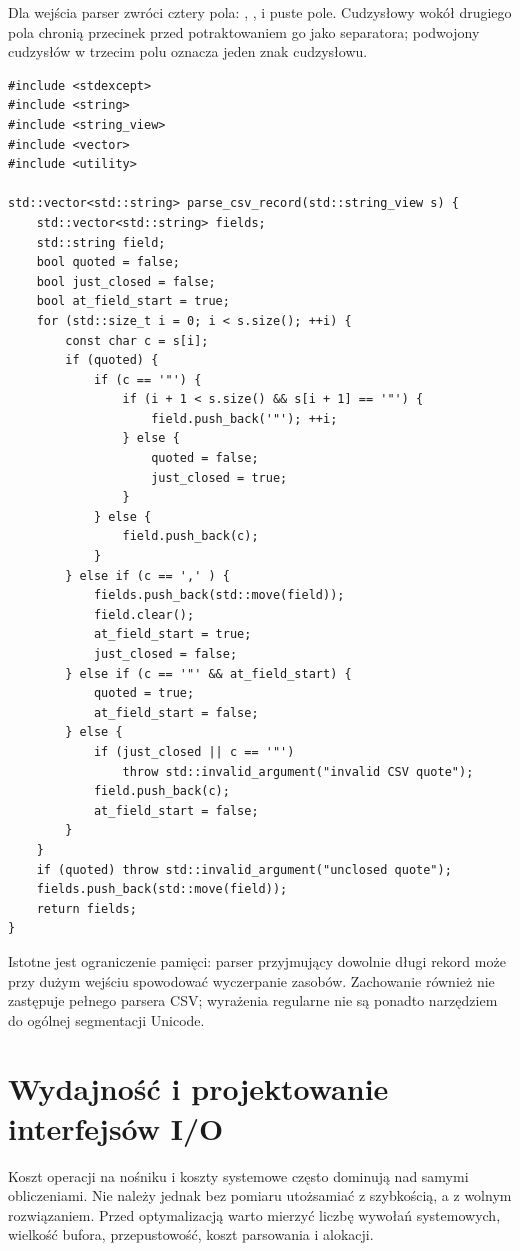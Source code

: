 Dla wejścia  parser zwróci cztery pola:
, ,  i puste pole. Cudzysłowy wokół
drugiego pola chronią przecinek przed potraktowaniem go jako separatora;
podwojony cudzysłów w trzecim polu oznacza jeden znak cudzysłowu.

\begin{lstlisting}[caption={Parser pojedynczego rekordu CSV (C++20).}]
#include <stdexcept>
#include <string>
#include <string_view>
#include <vector>
#include <utility>

std::vector<std::string> parse_csv_record(std::string_view s) {
    std::vector<std::string> fields;
    std::string field;
    bool quoted = false;
    bool just_closed = false;
    bool at_field_start = true;
    for (std::size_t i = 0; i < s.size(); ++i) {
        const char c = s[i];
        if (quoted) {
            if (c == '"') {
                if (i + 1 < s.size() && s[i + 1] == '"') {
                    field.push_back('"'); ++i;
                } else {
                    quoted = false;
                    just_closed = true;
                }
            } else {
                field.push_back(c);
            }
        } else if (c == ',' ) {
            fields.push_back(std::move(field));
            field.clear();
            at_field_start = true;
            just_closed = false;
        } else if (c == '"' && at_field_start) {
            quoted = true;
            at_field_start = false;
        } else {
            if (just_closed || c == '"')
                throw std::invalid_argument("invalid CSV quote");
            field.push_back(c);
            at_field_start = false;
        }
    }
    if (quoted) throw std::invalid_argument("unclosed quote");
    fields.push_back(std::move(field));
    return fields;
}
\end{lstlisting}

Istotne jest ograniczenie pamięci: parser przyjmujący dowolnie długi
rekord może przy dużym wejściu spowodować wyczerpanie zasobów.
Zachowanie  również nie zastępuje pełnego parsera CSV;
wyrażenia regularne nie są ponadto narzędziem do ogólnej segmentacji Unicode.

\section{Wydajność i projektowanie interfejsów I/O}

Koszt operacji na nośniku i koszty systemowe często dominują nad
samymi obliczeniami. Nie należy jednak bez pomiaru utożsamiać
 z szybkością, a  z wolnym rozwiązaniem.
Przed optymalizacją warto mierzyć liczbę wywołań systemowych,
wielkość bufora, przepustowość, koszt parsowania i alokacji.

